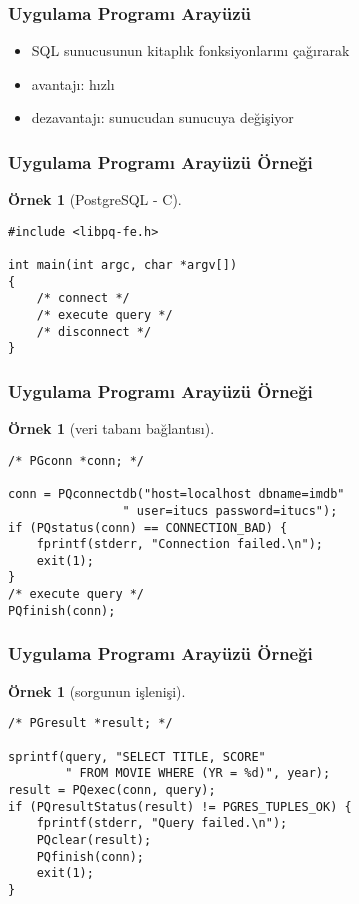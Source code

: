 \documentclass[dvipsnames]{beamer}
\theoremstyle{definition}
\theoremstyle{example}
\newtheorem{ornek}[theorem]{Örnek}
\theoremstyle{plain}
\begin{document}
\begin{frame}
  \frametitle{Uygulama Programı Arayüzü}

  \begin{itemize}
    \item SQL sunucusunun kitaplık fonksiyonlarını çağırarak

    \pause
    \bigskip
    \item avantajı: hızlı
    \item dezavantajı: sunucudan sunucuya değişiyor
  \end{itemize}
\end{frame}

\begin{frame}[fragile]
  \frametitle{Uygulama Programı Arayüzü Örneği}

  \begin{ornek}[PostgreSQL - C]
    \begin{lstlisting}
#include <libpq-fe.h>

int main(int argc, char *argv[])
{
    /* connect */
    /* execute query */
    /* disconnect */
}
    \end{lstlisting}
  \end{ornek}
\end{frame}

\begin{frame}[fragile]
  \frametitle{Uygulama Programı Arayüzü Örneği}

  \begin{ornek}[veri tabanı bağlantısı]
    \begin{lstlisting}
/* PGconn *conn; */

conn = PQconnectdb("host=localhost dbname=imdb"
                " user=itucs password=itucs");
if (PQstatus(conn) == CONNECTION_BAD) {
    fprintf(stderr, "Connection failed.\n");
    exit(1);
}
/* execute query */
PQfinish(conn);
    \end{lstlisting}
  \end{ornek}
\end{frame}

\begin{frame}[fragile]
  \frametitle{Uygulama Programı Arayüzü Örneği}

  \begin{ornek}[sorgunun işlenişi]
    \begin{lstlisting}
/* PGresult *result; */

sprintf(query, "SELECT TITLE, SCORE"
        " FROM MOVIE WHERE (YR = %d)", year);
result = PQexec(conn, query);
if (PQresultStatus(result) != PGRES_TUPLES_OK) {
    fprintf(stderr, "Query failed.\n");
    PQclear(result);
    PQfinish(conn);
    exit(1);
}
    \end{lstlisting}
  \end{ornek}
\end{frame}
\end{document}
